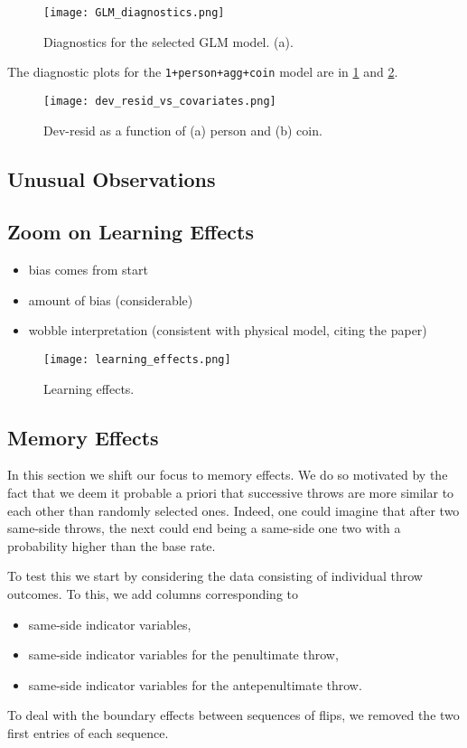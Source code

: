 \documentclass[a4paper, 12pt,oneside]{article}
\begin{document}
			\begin{figure}[htb]
				\centering
				\texttt{[image: GLM\_diagnostics.png]}
				\caption{Diagnostics for the selected GLM model. (a).}
				\label{fig:glm-diagnostic}
			\end{figure}
			The diagnostic plots for the \texttt{1+person+agg+coin} model are in \ref{fig:glm-diagnostic} and \ref{fig:dev-resid-vs-covariates}. 
			\begin{figure}[htb]
				\centering
				\texttt{[image: dev\_resid\_vs\_covariates.png]}
				\caption{Dev-resid as a function of (a) person and (b) coin.}
				\label{fig:dev-resid-vs-covariates}
			\end{figure}	
		\subsection{Unusual Observations}

		\subsection{Zoom on Learning Effects}
		\begin{itemize}
			\item bias comes from start
			\item amount of bias (considerable)
			\item wobble interpretation (consistent with physical model, citing the paper)
		\end{itemize}
		\lipsum[1]
		\begin{figure}[htb]
			\centering
			\texttt{[image: learning\_effects.png]}
			\caption{Learning effects.}
			\label{fig:learning-effects}
		\end{figure}
		\subsection{Memory Effects}
		In this section we shift our focus to memory effects. We do so motivated by the fact that we deem it probable a priori that successive throws are more similar to each other than randomly selected ones. Indeed, one could imagine that after two same-side throws, the next could end being a same-side one two with a probability higher than the base rate. 
		
		To test this we start by considering the data consisting of individual throw outcomes. To this, we add columns corresponding to 
		\begin{itemize}
			\item same-side indicator variables,
			\item same-side indicator variables for the penultimate throw,
			\item same-side indicator variables for the antepenultimate throw.
		\end{itemize}
		To deal with the boundary effects between sequences of flips, we removed the two first entries of each sequence. 
		
\end{document}
